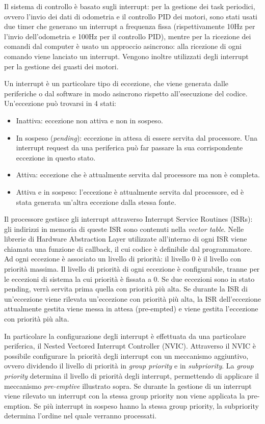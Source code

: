 Il sistema di controllo è basato sugli interrupt: per la gestione dei task periodici, ovvero l'invio dei dati di odometria e il controllo PID dei motori, sono stati usati due timer che generano un interrupt a frequenza fissa (rispettivamente 10Hz per l'invio dell'odometria e 100Hz per il controllo PID), mentre per la ricezione dei comandi dal computer è usato un approccio asincrono: alla ricezione di ogni comando viene lanciato un interrupt. Vengono inoltre utilizzati degli interrupt per la gestione dei guasti dei motori.

Un interrupt è un particolare tipo di eccezione, che viene generata dalle periferiche o dal software in modo asincrono rispetto all'esecuzione del codice.
Un'eccezione può trovarsi in 4 stati:
\begin{itemize}
    \item Inattiva: eccezione non attiva e non in sospeso.
    \item In sospeso (\textit{pending}): eccezione in attesa di essere servita dal processore. Una interrupt request da una periferica può far passare la sua corrispondente eccezione in questo stato. 
    \item Attiva: eccezione che è attualmente servita dal processore ma non è completa.
    \item Attiva e in sospeso: l'eccezione è attualmente servita dal processore, ed è stata generata un'altra eccezione dalla stessa fonte. 
\end{itemize}
Il processore gestisce gli interrupt attraverso Interrupt Service Routines (ISRs): gli indirizzi in memoria di queste ISR sono contenuti nella \textit{vector table}. Nelle librerie di Hardware Abstraction Layer utilizzate all'interno di ogni ISR viene chiamata una funzione di callback, il cui codice è definibile dal programmatore.
Ad ogni eccezione è associato un livello di priorità: il livello 0 è il livello con priorità massima. Il livello di priorità di ogni eccezione è configurabile, tranne per le eccezioni di sistema la cui priorità è fissata a 0.
Se due eccezioni sono in stato pending, verrà servita prima quella con priorità più alta.
Se durante la ISR di un'eccezione viene rilevata un'eccezione con priorità più alta, la ISR dell'eccezione attualmente gestita viene messa in attesa (pre-empted) e viene gestita l'eccezione con priorità più alta.

In particolare la configurazione degli interrupt è effettuata da una particolare periferica, il Nested Vectored Interrupt Controller (NVIC). Attraverso il NVIC è possibile configurare la priorità degli interrupt con un meccanismo aggiuntivo, ovvero dividendo il livello di priorità in \textit{group priority} e in \textit{subpriority}. 
La \textit{group priority} determina il livello di priorità degli interrupt, permettendo di applicare il meccanismo \textit{pre-emptive} illustrato sopra. Se durante la gestione di un interrupt viene rilevato un interrupt con la stessa group priority non viene applicata la pre-emption.
Se più interrupt in sospeso hanno la stessa group priority, la subpriority determina l'ordine nel quale verranno processati.

